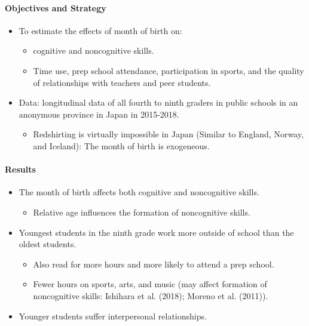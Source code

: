 \documentclass[../root]{subfiles}
\begin{document}
    \paragraph{Objectives and Strategy}

    \begin{itemize}
      \item To estimate the effects of month of birth on:
      \begin{itemize}
        \item cognitive and noncognitive skills.
        \item Time use, prep school attendance, participation in sports, and the quality of relationships with teachers and peer students.
      \end{itemize}
      \item Data: longitudinal data of all fourth to ninth graders in public schools in an anonymous province in Japan in 2015-2018.
      \begin{itemize}
        \item Redshirting is virtually impossible in Japan (Similar to England, Norway, and Iceland): The month of birth is exogeneous.
      \end{itemize}
    \end{itemize}

    \paragraph{Results}

    \begin{itemize}
      \item The month of birth affects both cognitive and noncognitive skills.
      \begin{itemize}
        \item Relative age influences the formation of noncognitive skills.
      \end{itemize}
      \item Youngest students in the ninth grade work more outside of school than the oldest students.
      \begin{itemize}
        \item Also read for more hours and more likely to attend a prep school.
        \item Fewer hours on sports, arts, and music (may affect formation of noncognitive skills: Ishihara et al. (2018); Moreno et al. (2011)).
      \end{itemize}
      \item Younger students suffer interpersonal relationships.
    \end{itemize}
\end{document}

